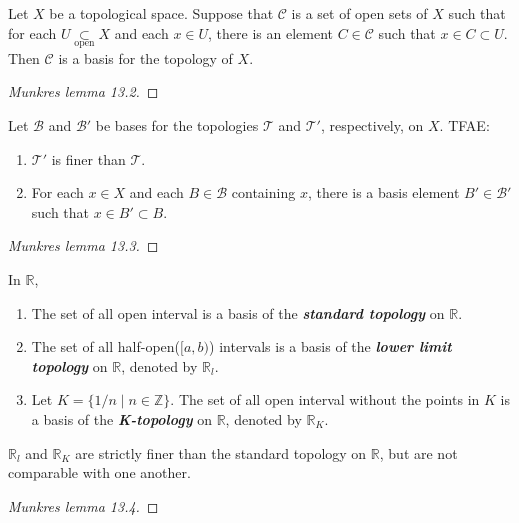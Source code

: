 \begin{mylemma}
Let $X$ be a topological space. Suppose that $\mathcal{C}$ is a set of open sets of $X$ such that for each $U\underset{\text{open}}{\subset} X$ and each $x\in U$, there is an element $C\in \mathcal{C}$ such that $x\in C\subset U$. Then $\mathcal{C}$ is a basis for the topology of $X$.
\end{mylemma}
\begin{proof}
[Munkres lemma 13.2]
\end{proof}

\begin{mylemma}
Let $\mathcal{B}$ and $\mathcal{B}'$ be bases for the topologies $\mathcal{T}$ and $\mathcal{T}'$, respectively, on $X$. TFAE:
\begin{enumerate}[label={(\alph*)}]
\item $\mathcal{T}'$ is finer than $\mathcal{T}$.
\item For each $x\in X$ and each $B\in \mathcal{B}$ containing $x$, there is a basis element $B'\in \mathcal{B}'$ such that $x\in B'\subset B$.
\end{enumerate}
\end{mylemma}
\begin{proof}
[Munkres lemma 13.3]
\end{proof}

\begin{mydefinition}
In $\mathbb{R}$,
\begin{enumerate}[label={(\alph*)}]
\item The set of all open interval is a basis of the \textbf{\emph{standard topology}} on $\mathbb{R}$.
\item The set of all half-open($[a,b)$) intervals is a basis of the \textbf{\emph{lower limit topology}} on $\mathbb{R}$, denoted by $\mathbb{R}_l$.
\item Let $K=\{1/n\mid n\in \mathbb{Z}\}$. The set of all open interval without the points in $K$ is a basis of the \textbf{\emph{K-topology}} on $\mathbb{R}$, denoted by $\mathbb{R}_K$.
\end{enumerate}
\end{mydefinition}

\begin{mylemma}
$\mathbb{R}_l$ and $\mathbb{R}_K$ are strictly finer than the standard topology on $\mathbb{R}$, but are not comparable with one another.
\end{mylemma}
\begin{proof}
[Munkres lemma 13.4]
\end{proof}

